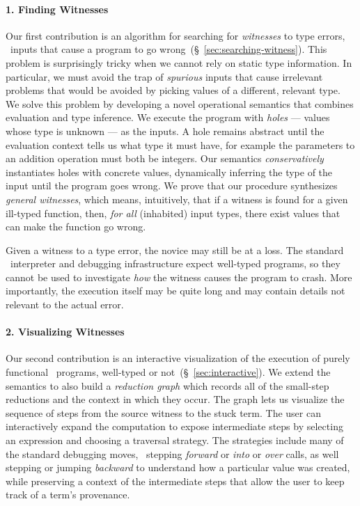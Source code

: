 \paragraph{1. Finding Witnesses}
Our first contribution is an algorithm for searching for
\emph{witnesses} to type errors, \ie\ inputs that cause a
program to go wrong~(\S~\ref{sec:searching-witness}).
%
This problem is surprisingly tricky when we cannot rely on
static type information.
%
In particular, we must avoid the trap of \emph{spurious} inputs
that cause irrelevant problems that would be avoided by picking
values of a different, relevant type.
%
We solve this problem by developing a novel operational semantics
that combines evaluation and type inference.
%
We execute the program with \emph{holes} --- values whose type is
unknown --- as the inputs.
%
A hole remains abstract until the evaluation context tells us what type
it must have, for example the parameters to an addition operation must
both be integers.
%
Our semantics \emph{conservatively} instantiates holes with concrete
values, dynamically inferring the type of the input
until the program goes wrong.
%
We prove that our procedure synthesizes \emph{general witnesses}, which
means, intuitively, that if a witness is found for a given ill-typed
function, then, \emph{for all} (inhabited) input types, there exist
values that can make the function go wrong.

Given a witness to a type error, the novice may still be at a loss.
%
The standard \ocaml\ interpreter and debugging infrastructure expect
well-typed programs, so they cannot be used to investigate \emph{how}
the witness causes the program to crash.
%
More importantly, the execution itself may be quite long and may contain
details not relevant to the actual error.

\paragraph{2. Visualizing Witnesses}
Our second contribution is an interactive visualization of the
execution of purely functional \ocaml\ programs, well-typed or not~(\S~\ref{sec:interactive}).
%
We extend the semantics to also build a \emph{reduction graph}
which records all of the small-step reductions and the context
in which they occur.
%
The graph lets us visualize the sequence of
steps from the source witness to the stuck term. The user can 
interactively expand the computation to expose intermediate steps
by selecting an expression and choosing a traversal strategy.
%
The strategies include many of the standard debugging moves, \eg\
stepping \emph{forward} or \emph{into} or \emph{over} calls, as well
stepping or jumping \emph{backward} to understand how a particular
value was created, while preserving a context of the intermediate
steps that allow the user to keep track of a term's provenance.

